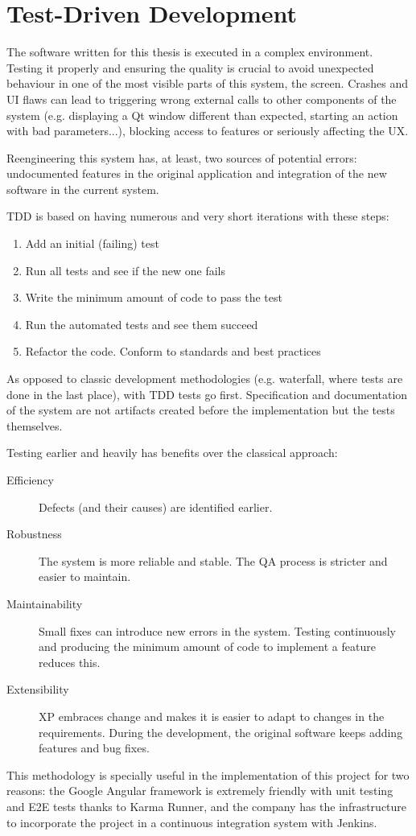 \section{Test-Driven Development}
\label{sec:testdrivendev}
The software written for this thesis is executed in a complex environment.
Testing it properly and ensuring the quality is crucial to avoid unexpected behaviour in one of the most visible parts of this system, the screen.
Crashes and \ac{UI} flaws can lead to triggering wrong external calls to other components of the system (e.g. displaying a Qt window different than expected, starting an action with bad parameters...), blocking access to features or seriously affecting the \ac{UX}.

Reengineering this system has, at least, two sources of potential errors: 
undocumented features in the original application and integration of the new software in the current system.

\ac{TDD} is based on having numerous and very short iterations with these steps:
\begin{enumerate}
    \item Add an initial (failing) test
    \item Run all tests and see if the new one fails
    \item Write the minimum amount of code to pass the test
    \item Run the automated tests and see them succeed
    \item Refactor the code. Conform to standards and best practices
\end{enumerate}

As opposed to classic development methodologies (e.g. waterfall, where tests are done in the last place), with \ac{TDD} tests go first. 
Specification and documentation of the system are not artifacts created before the implementation but the tests themselves.

Testing earlier and heavily has benefits over the classical approach:
\begin{description}
\item[Efficiency] Defects (and their causes) are identified earlier.
\item[Robustness] The system is more reliable and stable. 
The \ac{QA} process is stricter and easier to maintain.
\item[Maintainability] Small fixes can introduce new errors in the system. 
Testing continuously and producing the minimum amount of code to implement a feature reduces this.
\item[Extensibility] \ac{XP} embraces change and makes it is easier to adapt to changes in the requirements. 
During the development, the original software keeps adding features and bug fixes.
\end{description}

This methodology is specially useful in the implementation of this project for two reasons: 
the Google Angular framework is extremely friendly with unit testing and \ac{E2E} tests thanks to Karma Runner, and the company has the infrastructure to incorporate the project in a continuous integration system with Jenkins.